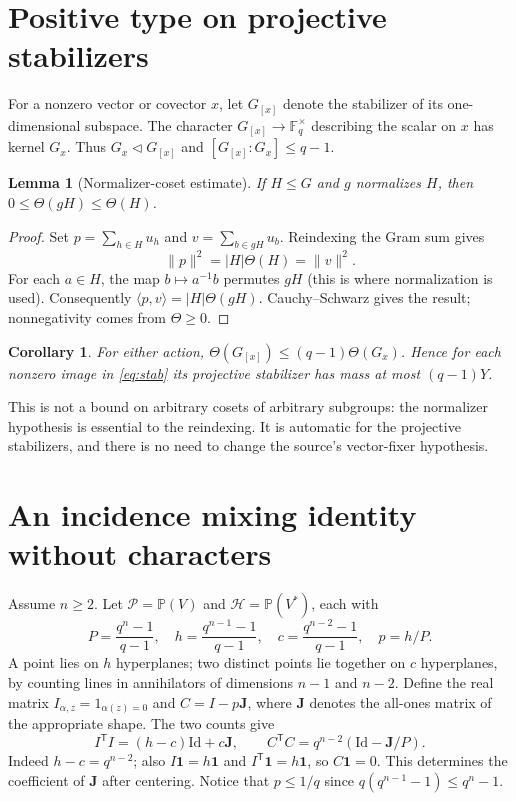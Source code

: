 \documentclass[11pt]{article}
\newtheorem{lemma}[theorem]{Lemma}
\newtheorem{corollary}[theorem]{Corollary}
\theoremstyle{remark}\newtheorem{remark}[theorem]{Remark}
\newcommand{\F}{\mathbb F}
\newcommand{\Pj}{\mathbb P}
\newcommand{\wt}{\Theta}
\begin{document}
\section{Positive type on projective stabilizers}
For a nonzero vector or covector $x$, let $G_{[x]}$ denote the stabilizer of its one-dimensional subspace. The character $G_{[x]}\to\F_q^\times$ describing the scalar on $x$ has kernel $G_x$. Thus $G_x\triangleleft G_{[x]}$ and $[G_{[x]}:G_x]\le q-1$.
\begin{lemma}[Normalizer-coset estimate]\label{lem:coset}
If $H\le G$ and $g$ normalizes $H$, then $0\le \wt(gH)\le \wt(H)$.
\end{lemma}
\begin{proof}
Set $p=\sum_{h\in H}u_h$ and $v=\sum_{b\in gH}u_b$. Reindexing the Gram sum gives
\[
 \|p\|^2=|H|\wt(H)=\|v\|^2.
\]
For each $a\in H$, the map $b\mapsto a^{-1}b$ permutes $gH$ (this is where normalization is used). Consequently $\langle p,v\rangle=|H|\wt(gH)$. Cauchy--Schwarz gives the result; nonnegativity comes from $\wt\ge0$.
\end{proof}
\begin{corollary}\label{cor:line}
For either action, $\wt(G_{[x]})\le(q-1)\wt(G_x)$. Hence for each nonzero image in \eqref{eq:stab} its projective stabilizer has mass at most $(q-1)Y$.
\end{corollary}
This is not a bound on arbitrary cosets of arbitrary subgroups: the normalizer hypothesis is essential to the reindexing. It is automatic for the projective stabilizers, and there is no need to change the source's vector-fixer hypothesis.

\section{An incidence mixing identity without characters}
Assume $n\ge2$. Let $\mathcal P=\Pj(V)$ and $\mathcal H=\Pj(V^*)$, each with
\[
 P=\frac{q^n-1}{q-1},\quad h=\frac{q^{n-1}-1}{q-1},\quad
 c=\frac{q^{n-2}-1}{q-1},\quad p=h/P.
\]
A point lies on $h$ hyperplanes; two distinct points lie together on $c$ hyperplanes, by counting lines in annihilators of dimensions $n-1$ and $n-2$. Define the real matrix $I_{\alpha,z}=1_{\alpha(z)=0}$ and $C=I-p\mathbf J$, where $\mathbf J$ denotes the all-ones matrix of the appropriate shape. The two counts give
\begin{equation}\label{eq:gram}
 I^{\mathsf T}I=(h-c)\mathrm{Id}+c\mathbf J,
 \qquad C^{\mathsf T}C=q^{n-2}(\mathrm{Id}-\mathbf J/P).
\end{equation}
Indeed $h-c=q^{n-2}$; also $I\mathbf1=h\mathbf1$ and $I^{\mathsf T}\mathbf1=h\mathbf1$, so $C\mathbf1=0$. This determines the coefficient of $\mathbf J$ after centering. Notice that $p\le1/q$ since $q(q^{n-1}-1)\le q^n-1$.
\end{document}
